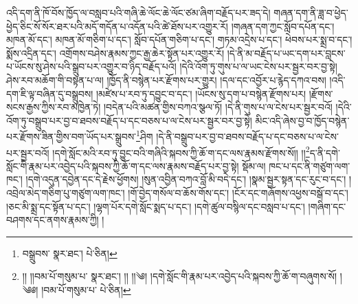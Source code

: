 འདི་དག་ནི་ཁོ་བོས་ཁྱོད་ལ་བསླབ་པའི་གཞི་ཆེ་ལོང་ཆེ་ལོང་ཙམ་ཞིག་བརྗོད་པར་ཟད་དེ། གཞན་དག་ནི་ཟླ་བ་ཕྱེད་ཕྱེད་ཅིང་སོ་སོར་ཐར་པའི་མདོ་གདོན་པ་འདོན་པའི་ཚེ་ཐོས་པར་འགྱུར་རོ། །གཞན་དག་ཀྱང་སློབ་དཔོན་དང་། མཁན་མོ་དང་། མཁན་མོ་གཅིག་པ་དང་། སློབ་དཔོན་གཅིག་པ་དང་། གཏམ་འདྲེས་པ་དང་། ཕེབས་པར་སྨྲ་བ་དང་། སྨོས་འདྲིན་དང་། འགྲོགས་བཤེས་རྣམས་ཀྱང་རྒྱ་ཆེར་སྟོན་པར་འགྱུར་རོ། །དེ་ནི་མ་བརྗོད་པ་ཡང་དག་པར་བླངས་པ་ཡོངས་སུ་ཤེས་པའི་སྒྲུབ་པར་འགྱུར་བ་ཉིད་བརྗོད་པའོ། །དེའི་འོག་ཏུ་གུས་པ་ལ་ཡང་ངེས་པར་སྦྱར་བར་བྱ་སྟེ། ཤེས་རབ་མཆོག་གི་བསྟན་པ་ལ། །ཁྱོད་ནི་བསྙེན་པར་རྫོགས་པར་གྱུར། །དལ་དང་འབྱོར་པ་རྙེད་དཀའ་བས། །འདི་དག་ཇི་ལྟ་བཞིན་དུ་བསྒྲུབས། །མཛེས་པ་རབ་ཏུ་དབྱུང་བ་དང་། །ཡོངས་སུ་དག་པ་བསྙེན་རྫོགས་པར། །རྫོགས་སངས་རྒྱས་ཀྱིས་རབ་མཁྱེན་ཏེ། །བདེན་པའི་མཚན་གྱིས་བཀའ་སྩལ་ཏོ། །དེ་ནི་གུས་པ་ལ་ངེས་པར་སྦྱར་བའོ། །དེའི་འོག་ཏུ་བསྒྲུབ་པར་བྱ་བ་ཐབས་བརྗོད་པ་དང་བཅས་པ་ལ་ངེས་པར་སྦྱར་བར་བྱ་སྟེ། མིང་འདི་ཞེས་བྱ་བ་ཁྱོད་བསྙེན་པར་རྫོགས་ཟིན་གྱིས་བག་ཡོད་པར་སྒྲུབས་\footnote{བསྒྲུབས་  སྣར་ཐང་།  པེ་ཅིན། }ཤིག །དེ་ནི་བསྒྲུབ་པར་བྱ་བ་ཐབས་བརྗོད་པ་དང་བཅས་པ་ལ་ངེས་པར་སྦྱར་བའོ། །དགེ་སློང་མའི་རབ་ཏུ་བྱུང་བའི་གཞིའི་སྐབས་ཀྱི་ཆོ་ག་དང་ལས་རྣམས་རྫོགས་སོ།། །།\footnote{།། །།བམ་པོ་གསུམ་པ་  སྣར་ཐང་། །། །།༄། །དགེ་སློང་གི་རྣམ་པར་འབྱེད་པའི་སྐབས་ཀྱི་ཆོ་ག་བཞུགས་སོ། །༄༅། །བམ་པོ་གསུམ་པ་  པེ་ཅིན། }ད་ནི་དགེ་སློང་གི་རྣམ་པར་འབྱེད་པའི་སྐབས་ཀྱི་ཆོ་ག་དང་ལས་རྣམས་བརྗོད་པར་བྱ་སྟེ། སྡོམ་ལ། ཁང་པ་དང་ནི་གཙུག་ལག་ཁང་། །དགེ་འདུན་དབྱེན་དང་དེ་རྗེས་ཕྱོགས། །སུན་འབྱིན་བཀའ་བློ་མི་བདེ་དང་། །སྣམ་སྦྱར་སྟན་དང་རུང་བ་དང་། །འབྲེལ་མེད་གཅིག་པུ་གཙུག་ལག་ཁང་། །གོ་བྱེད་གསོལ་བ་ཆོས་གོས་དང་། །ངོར་དང་གཞོགས་འཕྱས་བསྒོ་བ་དང་། །ཅང་མི་སྨྲ་དང་སྟོན་པ་དང་། །ལྷག་པོར་དགེ་སློང་སྨད་པ་དང་། །དགེ་ཚུལ་བསྙིལ་དང་བསླབ་པ་དང་། །གཞིག་དང་བཤགས་དང་ནགས་རྣམས་ཀྱི། །
